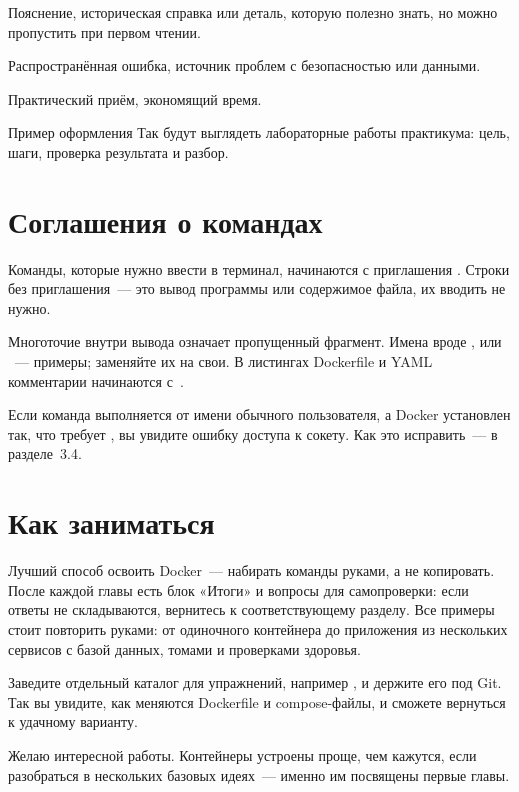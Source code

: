 \begin{notebox}
Пояснение, историческая справка или деталь, которую полезно знать,
но можно пропустить при первом чтении.
\end{notebox}

\begin{warnbox}
Распространённая ошибка, источник проблем с безопасностью или данными.
\end{warnbox}

\begin{tipbox}
Практический приём, экономящий время.
\end{tipbox}

\begin{labbox}{Пример оформления}
Так будут выглядеть лабораторные работы практикума: цель, шаги,
проверка результата и разбор.
\end{labbox}

\section*{Соглашения о командах}

Команды, которые нужно ввести в терминал, начинаются с приглашения
\cmd{\$}. Строки без приглашения~--- это вывод программы или содержимое
файла, их вводить не нужно.


Многоточие  внутри вывода означает пропущенный фрагмент.
Имена вроде ,  или ~--- примеры; заменяйте их
на свои. В листингах Dockerfile и YAML комментарии начинаются с~\cmd{\#}.

Если команда выполняется от имени обычного пользователя, а Docker установлен
так, что требует , вы увидите ошибку доступа к сокету. Как это
исправить~--- в разделе~3.4.

\section*{Как заниматься}

Лучший способ освоить Docker~--- набирать команды руками, а не копировать.
После каждой главы есть блок «Итоги» и вопросы для самопроверки: если
ответы не складываются, вернитесь к соответствующему разделу.
Все примеры стоит повторить руками: от одиночного контейнера
до приложения из нескольких сервисов с базой данных, томами
и проверками здоровья.

\begin{tipbox}
Заведите отдельный каталог для упражнений, например ,
и держите его под Git. Так вы увидите, как меняются Dockerfile и compose-файлы,
и сможете вернуться к удачному варианту.
\end{tipbox}

Желаю интересной работы. Контейнеры устроены проще, чем кажутся,
если разобраться в нескольких базовых идеях~--- именно им посвящены
первые главы.
